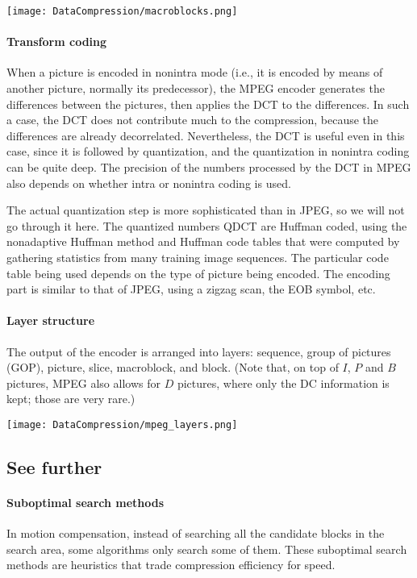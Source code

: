 \documentclass[a4paper, 11pt, openany]{book}
\begin{document}
\begin{center}
    \texttt{[image: DataCompression/macroblocks.png]}
\end{center}

\paragraph{Transform coding}
When a picture is encoded in nonintra mode (i.e., it is encoded by means of another
picture, normally its predecessor), the MPEG encoder generates the differences between the pictures, then applies the DCT to the differences. In such a case, the DCT does not
contribute much to the compression, because the differences are already decorrelated.
Nevertheless, the DCT is useful even in this case, since it is followed by quantization,
and the quantization in nonintra coding can be quite deep. The precision of the numbers processed by the DCT in MPEG also depends on whether intra or nonintra coding is used.

The actual quantization step is more sophisticated than in JPEG, so we will not go through it here. The quantized numbers QDCT are Huffman coded, using the nonadaptive Huffman method and Huffman code tables that were computed by gathering statistics from many training image sequences. The particular code table being used depends on the type of picture being encoded. The encoding part is similar to that of JPEG, using a zigzag scan, the EOB symbol, etc.


\paragraph{Layer structure}
The output of the encoder is arranged into layers: sequence, group of pictures (GOP), picture, slice, macroblock, and block. (Note that, on top of $I$, $P$ and $B$ pictures, MPEG also allows for $D$ pictures, where only the DC information is kept; those are very rare.)

\begin{center}
    \texttt{[image: DataCompression/mpeg\_layers.png]}
\end{center}


\subsection{See further}

\paragraph{Suboptimal search methods}
In motion compensation, instead of searching all the candidate blocks in the search area, some algorithms only search some of them. These suboptimal search methods are heuristics that trade compression efficiency for speed.
\end{document}
